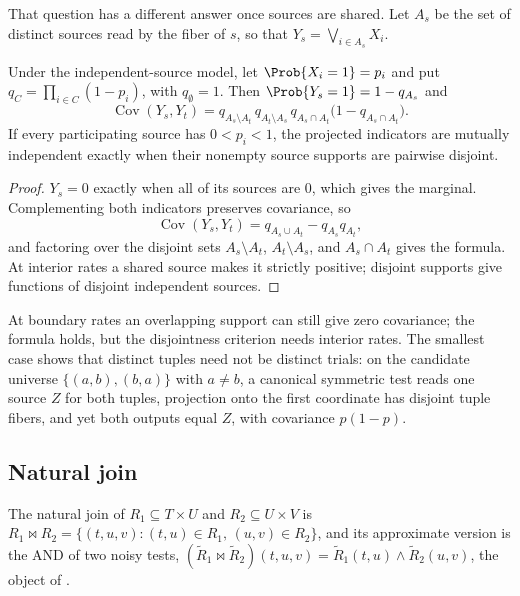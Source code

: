 That question has a different answer once sources are shared. Let $A_s$ be the
set of distinct sources read by the fiber of $s$, so that $Y_s =
\bigvee_{i \in A_s} X_i$.

\begin{theorem}
\label{thm:projection-shared-sources}
Under the independent-source model, let $\Prob{X_i = 1} = p_i$ and put $q_C =
\prod_{i \in C}(1 - p_i)$, with $q_\emptyset = 1$. Then $\Prob{Y_s = 1} = 1 -
q_{A_s}$ and
\[
  \operatorname{Cov}(Y_s, Y_t)
  = q_{A_s \setminus A_t}\, q_{A_t \setminus A_s}\, q_{A_s \cap A_t}
    \bigl(1 - q_{A_s \cap A_t}\bigr).
\]
If every participating source has $0 < p_i < 1$, the projected indicators are
mutually independent exactly when their nonempty source supports are pairwise
disjoint.
\end{theorem}

\begin{proof}
$Y_s = 0$ exactly when all of its sources are $0$, which gives the marginal.
Complementing both indicators preserves covariance, so
\[
  \operatorname{Cov}(Y_s, Y_t) = q_{A_s \cup A_t} - q_{A_s} q_{A_t},
\]
and factoring over the disjoint sets $A_s \setminus A_t$, $A_t \setminus A_s$,
and $A_s \cap A_t$ gives the formula. At interior rates a shared source makes it
strictly positive; disjoint supports give functions of disjoint independent
sources.
\end{proof}

At boundary rates an overlapping support can still give zero covariance; the
formula holds, but the disjointness criterion needs interior rates. The smallest
case shows that distinct tuples need not be distinct trials: on the candidate
universe $\{(a, b), (b, a)\}$ with $a \ne b$, a canonical symmetric test reads one
source $Z$ for both tuples, projection onto the first coordinate has disjoint
tuple fibers, and yet both outputs equal $Z$, with covariance $p(1 - p)$.

\subsection*{Natural join}

The natural join of $R_1 \subseteq T \times U$ and $R_2 \subseteq U
\times V$ is $R_1 \bowtie R_2 = \{(t, u, v) : (t, u) \in R_1,\, (u, v) \in
R_2\}$, and its approximate version is the AND of two noisy tests,
$(\tilde R_1 \bowtie \tilde R_2)(t, u, v) = \tilde R_1(t, u) \land \tilde R_2(u,
v)$, the object of .

